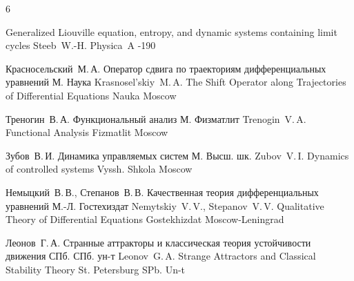 \begin{thebibliography}{6}

\paper Generalized Liouville equation, entropy, and dynamic systems containing limit cycles
 \by Steeb~W.-H.
 \jour Physica~A
-190

 \by Красносельский~М.\,А.
 \book Оператор сдвига по траекториям дифференциальных уравнений
\publaddr М.
 \publ Наука
\misctransl
\by Krasnosel'skiy~M.\,A.
\book The Shift Operator along Trajectories of Differential Equations 
\publ Nauka
\publaddr Moscow 

\by Треногин~В.\,А.
\book Функциональный анализ
\publaddr М.
\publ Физматлит
\misctransl
\by Trenogin~V.\,A.
\book Functional Analysis 
\publ Fizmatlit
\publaddr Moscow

\by Зубов~В.\,И.
\book Динамика управляемых систем
\publaddr М.
\publ Высш. шк.
\misctransl
\by Zubov~V.\,I.
\book Dynamics of controlled systems
\publ Vyssh. Shkola
\publaddr Moscow

\by Немыцкий~В.\,В., Степанов~В.\,В.
\book Качественная теория
дифференциальных уравнений
\publaddr М.-Л.
\publ Гостехиздат
\misctransl
\by Nemytskiy~V.\,V., Stepanov~V.\,V.
\book Qualitative Theory of Differential Equations
\publ Gostekhizdat
\publaddr Moscow-Leningrad


\by Леонов~Г.\,А.
\book Странные аттракторы и классическая теория устойчивости движения
\publaddr СПб.
\publ  СПб. ун-т
\misctransl
\by Leonov~G.\,A. 
\book Strange Attractors and Classical Stability Theory
\publaddr St. Petersburg
\publ SPb. Un-t


\end{thebibliography}


\noindent
\hskip6.5cm \thedate \par\noindent
\hskip6.5cm\therevdate


\pagebreak



\makeengtitlem



\newpage


%
%
% 